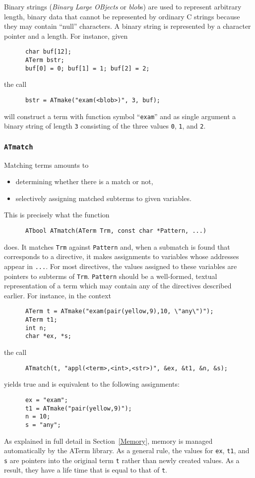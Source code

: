 \documentclass[a4,twoside,noweb]{article} %
\begin{document}
Binary strings (\emph{Binary Large OBjects} or \emph{blob\/}s) are used to represent arbitrary length, binary data
that cannot be represented by ordinary C strings because they may
contain ``null'' characters. A binary string is represented by
a character pointer and a length. For instance, given
\begin{verbatim}
      char buf[12];
      ATerm bstr;
      buf[0] = 0; buf[1] = 1; buf[2] = 2;
\end{verbatim}
the call
\begin{verbatim}
      bstr = ATmake("exam(<blob>)", 3, buf);
\end{verbatim}
will construct a term with function symbol ``{\tt exam}'' and as single
argument a binary string of length {\tt 3} consisting of the three
values {\tt 0}, {\tt 1}, and {\tt 2}.

\subsubsection{\label{ATmatch}{\tt ATmatch}}
Matching terms amounts to
\begin{itemize}
\item determining whether there is a match or not,
\item selectively assigning matched subterms to given variables.
\end{itemize}

\noindent This is precisely what the function
\begin{verbatim}
      ATbool ATmatch(ATerm Trm, const char *Pattern, ...)
\end{verbatim}
does. It matches {\tt Trm} against {\tt Pattern} and, when a submatch
is found that corresponds to a directive, it makes assignments to
variables whose addresses appear in {\tt ...}.
For most directives, the values assigned to these variables are pointers to
subterms of {\tt Trm}.
{\tt Pattern} should
be a well-formed, textual representation of a term which may contain
any of the directives described earlier.  For instance, in the context
\begin{verbatim}
      ATerm t = ATmake("exam(pair(yellow,9),10, \"any\")");
      ATerm t1;
      int n;
      char *ex, *s;
\end{verbatim}
the call 
\begin{verbatim}
      ATmatch(t, "appl(<term>,<int>,<str>)", &ex, &t1, &n, &s);
\end{verbatim}
yields true and is equivalent to the following assignments:
\begin{verbatim}
      ex = "exam";
      t1 = ATmake("pair(yellow,9)");
      n = 10;
      s = "any";
\end{verbatim}
As explained in full detail in Section~\ref{Memory}, memory is managed
automatically by the ATerm library.  As a general rule, the values for {\tt ex},
{\tt t1}, and {\tt s} are pointers into the original term {\tt t}
rather than newly created values. As a result, they have a life time
that is equal to that of {\tt t}.
\end{document}
